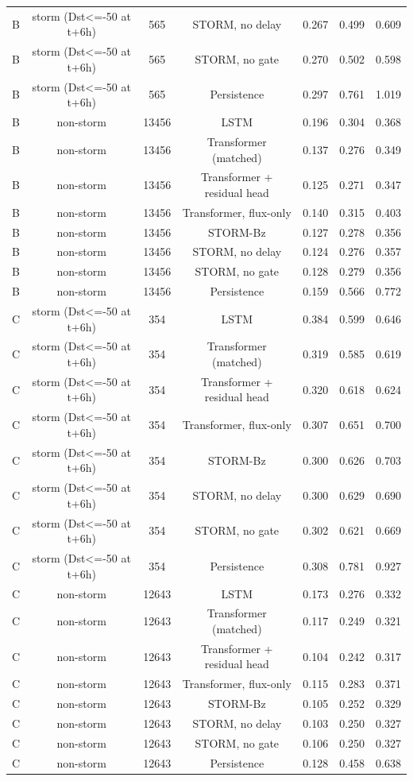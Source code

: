 \begin{tabular}{lcccccc}
B & storm (Dst<=-50 at t+6h) & 565 & STORM, no delay & 0.267 & 0.499 & 0.609 \\
B & storm (Dst<=-50 at t+6h) & 565 & STORM, no gate & 0.270 & 0.502 & 0.598 \\
B & storm (Dst<=-50 at t+6h) & 565 & Persistence & 0.297 & 0.761 & 1.019 \\
B & non-storm & 13456 & LSTM & 0.196 & 0.304 & 0.368 \\
B & non-storm & 13456 & Transformer (matched) & 0.137 & 0.276 & 0.349 \\
B & non-storm & 13456 & Transformer + residual head & 0.125 & 0.271 & 0.347 \\
B & non-storm & 13456 & Transformer, flux-only & 0.140 & 0.315 & 0.403 \\
B & non-storm & 13456 & STORM-Bz & 0.127 & 0.278 & 0.356 \\
B & non-storm & 13456 & STORM, no delay & 0.124 & 0.276 & 0.357 \\
B & non-storm & 13456 & STORM, no gate & 0.128 & 0.279 & 0.356 \\
B & non-storm & 13456 & Persistence & 0.159 & 0.566 & 0.772 \\
C & storm (Dst<=-50 at t+6h) & 354 & LSTM & 0.384 & 0.599 & 0.646 \\
C & storm (Dst<=-50 at t+6h) & 354 & Transformer (matched) & 0.319 & 0.585 & 0.619 \\
C & storm (Dst<=-50 at t+6h) & 354 & Transformer + residual head & 0.320 & 0.618 & 0.624 \\
C & storm (Dst<=-50 at t+6h) & 354 & Transformer, flux-only & 0.307 & 0.651 & 0.700 \\
C & storm (Dst<=-50 at t+6h) & 354 & STORM-Bz & 0.300 & 0.626 & 0.703 \\
C & storm (Dst<=-50 at t+6h) & 354 & STORM, no delay & 0.300 & 0.629 & 0.690 \\
C & storm (Dst<=-50 at t+6h) & 354 & STORM, no gate & 0.302 & 0.621 & 0.669 \\
C & storm (Dst<=-50 at t+6h) & 354 & Persistence & 0.308 & 0.781 & 0.927 \\
C & non-storm & 12643 & LSTM & 0.173 & 0.276 & 0.332 \\
C & non-storm & 12643 & Transformer (matched) & 0.117 & 0.249 & 0.321 \\
C & non-storm & 12643 & Transformer + residual head & 0.104 & 0.242 & 0.317 \\
C & non-storm & 12643 & Transformer, flux-only & 0.115 & 0.283 & 0.371 \\
C & non-storm & 12643 & STORM-Bz & 0.105 & 0.252 & 0.329 \\
C & non-storm & 12643 & STORM, no delay & 0.103 & 0.250 & 0.327 \\
C & non-storm & 12643 & STORM, no gate & 0.106 & 0.250 & 0.327 \\
C & non-storm & 12643 & Persistence & 0.128 & 0.458 & 0.638 \\
\bottomrule
\end{tabular}
